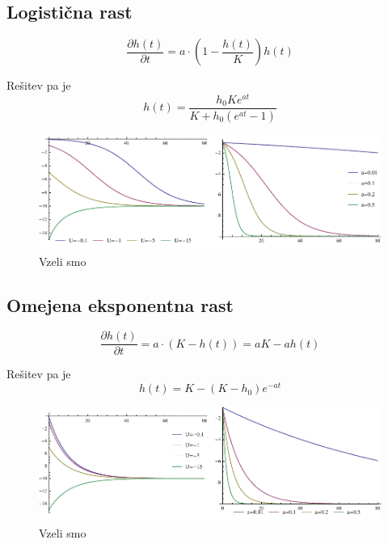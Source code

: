 \documentclass[a4paper, oneside, 12pt]{book}
\begin{document}
          \subsection{Logistična rast}

          \begin{equation}
            \frac{\partial h(t)}{\partial t} = a \cdot \left( 1 - \frac{h(t)}{K} \right) h(t)
          \end{equation}

          Rešitev pa je
          \begin{equation}
            h(t) = \frac{h_0 K e^{a t}}{K + h_0 (e^{a t}-1)}
          \end{equation}

            \begin{figure}[H]
              \begin{center}
                \includegraphics[width=14cm]{slike/logisticna-rast}
              \end{center}
              \caption{Vzeli smo }
              \label{fig:logisticna-rast}
            \end{figure}

          \subsection{Omejena eksponentna rast}

          \begin{equation}
            \frac{\partial h(t)}{\partial t} = a \cdot ( K - h(t) ) = a K - a h(t)
          \end{equation}

          Rešitev pa je
          \begin{equation}
            h(t) = K - (K - h_0) e^{-a t}
          \end{equation}

            \begin{figure}[H]
              \begin{center}
                \includegraphics[width=14cm]{slike/omejena-eksponentna-rast}
              \end{center}
              \caption{Vzeli smo }
              \label{fig:omejena-eksponentna-rast}
            \end{figure}
\end{document}
